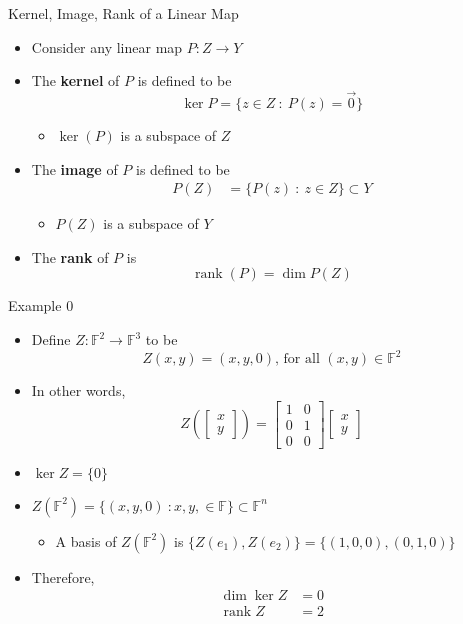 \documentclass[usenames,dvipsnames,10pt]{beamer}
\newcommand\F{\mathbb{F}}
\newcommand\rank{\operatorname{rank}}
\newcommand\zero{\vec{0}}
\begin{document}
\begin{frame}
  {Kernel, Image, Rank of a Linear Map}

  \begin{itemize}
  \item Consider any linear map $P: Z \rightarrow Y$
  \item The {\bf kernel} of $P$ is defined to be
    \[
      \ker P = \{ z \in Z\ :\ P(z) = \zero \}
    \]
    \begin{itemize}
    \item $\ker(P)$ is a subspace of $Z$
    \end{itemize}
  \item The {\bf image} of $P$ is defined to be
    \begin{align*}
      P(Z) &= \{ P(z)\ :\ z \in Z\} \subset Y
    \end{align*}
    \begin{itemize}
    \item $P(Z)$ is a subspace of $Y$
    \end{itemize}
  \item The {\bf rank} of $P$ is
    \[
      \rank(P) = \dim P(Z)
    \]
  \end{itemize}
\end{frame}

\begin{frame}
  {Example 0}

  \begin{itemize}
  \item Define $Z: \F^2 \rightarrow \F^3$ to be
    \[
      Z(x,y) = (x,y,0)\text{, for all }(x,y) \in \F^2
    \]
  \item In other words,
    \[
      Z\left(\begin{bmatrix} x \\ y \end{bmatrix}\right)
      =
      \begin{bmatrix} 1 & 0 \\ 0 & 1 \\ 0 & 0 \end{bmatrix}\begin{bmatrix} x \\ y \end{bmatrix}
    \]
  \item $\ker Z = \{0\}$
  \item $Z(\F^2) = \{ (x,y,0)\ : x,y, \in \F\} \subset \F^n$
    \begin{itemize}
    \item A basis of $Z(\F^2)$ is $\{Z(e_1), Z(e_2)\} = \{(1,0,0), (0,1,0)\}$
    \end{itemize}
  \item Therefore,
    \begin{align*}
      \dim\ker Z &= 0\\
      \rank Z &= 2
    \end{align*}
  \end{itemize}
\end{frame}
\end{document}
